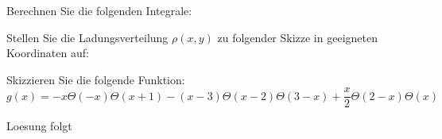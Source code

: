 \documentclass{atistandalonetask}
\begin{document}
  \begin{atiTask}[
    title = Delta- und Heaviside-Distributionen
  ]
  
 \begin{atiSubtasks}
 \item Berechnen Sie die folgenden Integrale:
 	\begin{atiSubequations}
 	\item{}
 	\item{}
 	\item{}
 	\item{}
 	\end{atiSubequations}
 \item Stellen Sie die Ladungsverteilung $\rho(x,y)$ zu folgender Skizze in geeigneten Koordinaten auf:
\begin{figure}[H]
\centering
\end{figure}
 
 \item Skizzieren Sie die folgende Funktion:
 \[
 g(x)=-x\Theta(-x)\Theta(x+1)-(x-3)\Theta(x-2)\Theta(3-x)+\frac{x}{2}\Theta(2-x)\Theta(x)
 \]
 \end{atiSubtasks}

  \end{atiTask}
  \begin{atiSolution}
Loesung folgt
  \end{atiSolution}
\end{document}
